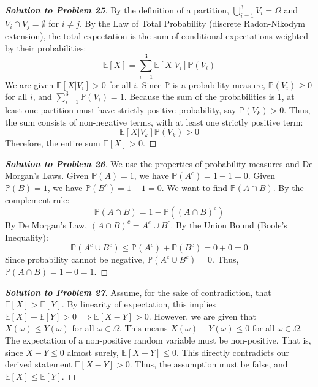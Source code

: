 \documentclass[11pt]{article}
\begin{document}
\begin{proof}[\textbf{Solution to Problem 25}]
By the definition of a partition, $\bigcup_{i=1}^3 V_i = \Omega$ and $V_i \cap V_j = \emptyset$ for $i \neq j$.
By the Law of Total Probability (discrete Radon-Nikodym extension), the total expectation is the sum of conditional expectations weighted by their probabilities:
\[ \mathbb{E}[X] = \sum_{i=1}^3 \mathbb{E}[X | V_i] \mathbb{P}(V_i) \]
We are given $\mathbb{E}[X | V_i] > 0$ for all $i$.
Since $\mathbb{P}$ is a probability measure, $\mathbb{P}(V_i) \ge 0$ for all $i$, and $\sum_{i=1}^3 \mathbb{P}(V_i) = 1$.
Because the sum of the probabilities is 1, at least one partition must have strictly positive probability, say $\mathbb{P}(V_k) > 0$.
Thus, the sum consists of non-negative terms, with at least one strictly positive term:
\[ \mathbb{E}[X | V_k] \mathbb{P}(V_k) > 0 \]
Therefore, the entire sum $\mathbb{E}[X] > 0$.
\end{proof}

\begin{proof}[\textbf{Solution to Problem 26}]
We use the properties of probability measures and De Morgan's Laws.
Given $\mathbb{P}(A) = 1$, we have $\mathbb{P}(A^c) = 1 - 1 = 0$.
Given $\mathbb{P}(B) = 1$, we have $\mathbb{P}(B^c) = 1 - 1 = 0$.
We want to find $\mathbb{P}(A \cap B)$. By the complement rule:
\[ \mathbb{P}(A \cap B) = 1 - \mathbb{P}((A \cap B)^c) \]
By De Morgan's Law, $(A \cap B)^c = A^c \cup B^c$.
By the Union Bound (Boole's Inequality):
\[ \mathbb{P}(A^c \cup B^c) \le \mathbb{P}(A^c) + \mathbb{P}(B^c) = 0 + 0 = 0 \]
Since probability cannot be negative, $\mathbb{P}(A^c \cup B^c) = 0$.
Thus, $\mathbb{P}(A \cap B) = 1 - 0 = 1$.
\end{proof}

\begin{proof}[\textbf{Solution to Problem 27}]
Assume, for the sake of contradiction, that $\mathbb{E}[X] > \mathbb{E}[Y]$.
By linearity of expectation, this implies $\mathbb{E}[X] - \mathbb{E}[Y] > 0 \implies \mathbb{E}[X - Y] > 0$.
However, we are given that $X(\omega) \le Y(\omega)$ for all $\omega \in \Omega$.
This means $X(\omega) - Y(\omega) \le 0$ for all $\omega \in \Omega$.
The expectation of a non-positive random variable must be non-positive. That is, since $X - Y \le 0$ almost surely, $\mathbb{E}[X - Y] \le 0$.
This directly contradicts our derived statement $\mathbb{E}[X - Y] > 0$. Thus, the assumption must be false, and $\mathbb{E}[X] \le \mathbb{E}[Y]$.
\end{proof}
\end{document}
